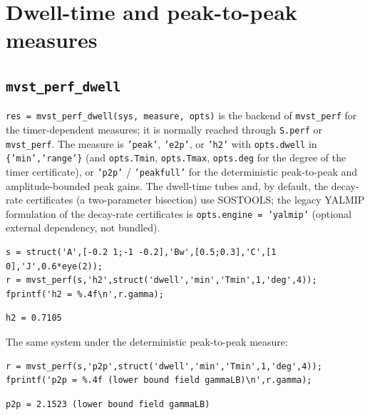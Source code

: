 \documentclass[11pt,oneside]{report}
\newcommand{\code}[1]{\texttt{#1}}
\begin{document}
\hypertarget{dwell-time-and-peak-to-peak-measures}{%
\section{Dwell-time and peak-to-peak measures}\label{dwell-time-and-peak-to-peak-measures}}

\hypertarget{mvst_perf_dwell}{%
\subsection{\texorpdfstring{\code{mvst\_perf\_dwell}}{mvst\_perf\_dwell}}\label{mvst_perf_dwell}}

\code{res = mvst\_perf\_dwell(sys, measure, opts)} is the backend of \code{mvst\_perf} for
the timer-dependent measures; it is normally reached through \code{S.perf} or
\code{mvst\_perf}. The measure is \code{'peak'}, \code{'e2p'}, or \code{'h2'} with \code{opts.dwell} in
\code{\{'min','range'\}} (and \code{opts.Tmin}, \code{opts.Tmax}, \code{opts.deg} for the degree of the
timer certificate), or \code{'p2p'} / \code{'peakfull'} for the deterministic peak-to-peak
and amplitude-bounded peak gains. The dwell-time tubes and, by default, the
decay-rate certificates (a two-parameter bisection) use SOSTOOLS; the legacy YALMIP
formulation of the decay-rate certificates is \code{opts.engine = 'yalmip'} (optional
external dependency, not bundled).

\begin{lstlisting}[style=matlabstyle]
s = struct('A',[-0.2 1;-1 -0.2],'Bw',[0.5;0.3],'C',[1 0],'J',0.6*eye(2));
r = mvst_perf(s,'h2',struct('dwell','min','Tmin',1,'deg',4));
fprintf('h2 = %.4f\n',r.gamma);
\end{lstlisting}

\begin{lstlisting}[style=outputstyle]
h2 = 0.7105
\end{lstlisting}

The same system under the deterministic peak-to-peak measure:

\begin{lstlisting}[style=matlabstyle]
r = mvst_perf(s,'p2p',struct('dwell','min','Tmin',1,'deg',4));
fprintf('p2p = %.4f (lower bound field gammaLB)\n',r.gamma);
\end{lstlisting}

\begin{lstlisting}[style=outputstyle]
p2p = 2.1523 (lower bound field gammaLB)
\end{lstlisting}
\end{document}
